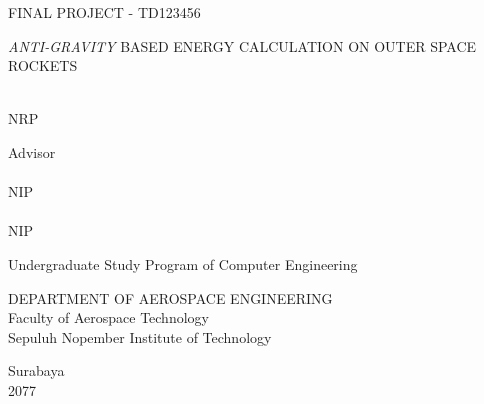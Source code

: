 \begin{large}
  FINAL PROJECT - TD123456
\end{large}

\vspace{\fill}

\begin{spacing}{1.5}
  \begin{Large}
    \emph{ANTI-GRAVITY} BASED ENERGY CALCULATION ON OUTER SPACE ROCKETS
  \end{Large}
\end{spacing}

\vspace{\fill}

\begin{large}
  \name{} \\
  \textmd{NRP \nrp{}}
\end{large}

\vspace{\fill}

\begin{large}
  \textmd{Advisor} \\
  \advisor{} \\
  \textmd{NIP \advisornip{}} \\
  \coadvisor{} \\
  \textmd{NIP \coadvisornip{}}
\end{large}

\vspace{\fill}

Undergraduate Study Program of Computer Engineering \\

\mdseries

DEPARTMENT OF AEROSPACE ENGINEERING \\
Faculty of Aerospace Technology \\
Sepuluh Nopember Institute of Technology

Surabaya \\
2077

